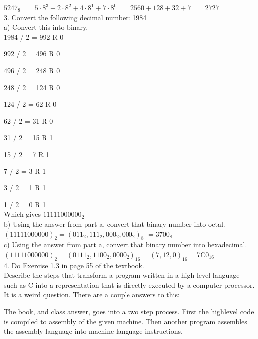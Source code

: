 $5 2 4 7_8$ $=$ $5 \cdot 8^3 + 2 \cdot 8^2 + 4 \cdot 8^1 + 7 \cdot 8^0 $ $=$ $ 2560 + 128 + 32 + 7$ $=$ $2727$ \\

3. Convert the following decimal number: 1984 \\

a) Convert this into binary. \\

1984 / 2 = 992 R 0 

992 / 2 = 496 R 0 

496 / 2 = 248 R 0

248 / 2 = 124 R 0

124 / 2 = 62 R 0

62 / 2 = 31 R 0

31 / 2 = 15 R 1

15 / 2 = 7 R 1

7 / 2 =  3 R 1

3 / 2 = 1 R 1

1 / 2 = 0 R 1 \\

Which gives $11111000000_2$ \\

b) Using the answer from part a. convert that binary number into octal. \\

$(11111000000)_2 =  (011_2, 111_2, 000_2, 000_2)_8$ $= 3700_8$ \\

c) Using the answer from part a, convert that binary number into hexadecimal. \\

$(11111000000)_2 = (0111_2,1100_2,0000_2)_{16} = 
(7,12,0)_{16}$$= $7C0$_{16}$ \\


4. Do Exercise 1.3 in page 55 of the textbook. \\

Describe the steps that transform a program written in a high-level language such as C into a representation that is directly executed by a computer processor. \\

It is a weird question. There are a couple answers to this:

The book, and class answer, goes into a two step process. First the highlevel code is compiled to assembly of the given machine. Then another program assembles the assembly language into machine language instructions. \\

